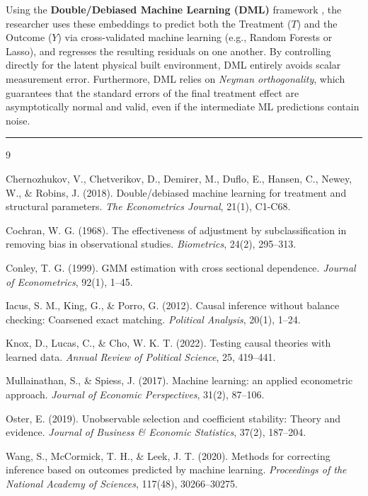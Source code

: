 \documentclass[11pt]{article}
\begin{document}
Using the \textbf{Double/Debiased Machine Learning (DML)} framework \citep{chernozhukov2018double}, the researcher uses these embeddings to predict both the Treatment ($T$) and the Outcome ($Y$) via cross-validated machine learning (e.g., Random Forests or Lasso), and regresses the resulting residuals on one another. By controlling directly for the latent physical built environment, DML entirely avoids scalar measurement error. Furthermore, DML relies on \textit{Neyman orthogonality}, which guarantees that the standard errors of the final treatment effect are asymptotically normal and valid, even if the intermediate ML predictions contain noise.


\vspace{1em}
\hrule
\vspace{1em}

\begin{thebibliography}{9}

Chernozhukov, V., Chetverikov, D., Demirer, M., Duflo, E., Hansen, C., Newey, W., \& Robins, J. (2018). 
\newblock Double/debiased machine learning for treatment and structural parameters.
\newblock \emph{The Econometrics Journal}, 21(1), C1-C68.

Cochran, W. G. (1968). 
\newblock The effectiveness of adjustment by subclassification in removing bias in observational studies.
\newblock \emph{Biometrics}, 24(2), 295--313.

Conley, T. G. (1999). 
\newblock GMM estimation with cross sectional dependence.
\newblock \emph{Journal of Econometrics}, 92(1), 1--45.

Iacus, S. M., King, G., \& Porro, G. (2012). 
\newblock Causal inference without balance checking: Coarsened exact matching.
\newblock \emph{Political Analysis}, 20(1), 1--24.

Knox, D., Lucas, C., \& Cho, W. K. T. (2022). 
\newblock Testing causal theories with learned data.
\newblock \emph{Annual Review of Political Science}, 25, 419--441.

Mullainathan, S., \& Spiess, J. (2017). 
\newblock Machine learning: an applied econometric approach.
\newblock \emph{Journal of Economic Perspectives}, 31(2), 87--106.

Oster, E. (2019). 
\newblock Unobservable selection and coefficient stability: Theory and evidence.
\newblock \emph{Journal of Business \& Economic Statistics}, 37(2), 187--204.

Wang, S., McCormick, T. H., \& Leek, J. T. (2020). 
\newblock Methods for correcting inference based on outcomes predicted by machine learning.
\newblock \emph{Proceedings of the National Academy of Sciences}, 117(48), 30266--30275.

\end{thebibliography}
\end{document}
